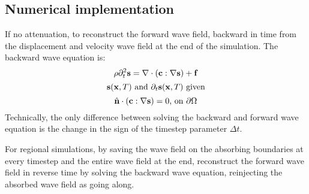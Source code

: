 \subsection{Numerical implementation}
If no attenuation, to reconstruct the forward wave field, backward in time from the displacement
and velocity wave field at the end of the simulation. The backward wave equation is:
\[ \rho\partial_t^2\mathbf{s}=\nabla\cdot(\mathbf{c}:\nabla\mathbf{s})+\mathbf{f} \]
\[ \mathbf{s}(\mathbf{x},T) \text{ and } \partial_t\mathbf{s}(\mathbf{x},T) \text{ given} \]
\[ \hat{\mathbf{n}}\cdot(\mathbf{c}:\nabla\mathbf{s})=0 \text{, on } \partial\Omega \]
Technically, the only difference between solving the backward and forward wave equation
is the change in the sign of the timestep parameter $\Delta t$.

For regional simulations, by saving the wave field on the absorbing boundaries at every timestep
and the entire wave field at the end, reconstruct the forward wave field in reverse time
by solving the backward wave equation, reinjecting the absorbed wave field as going along.

